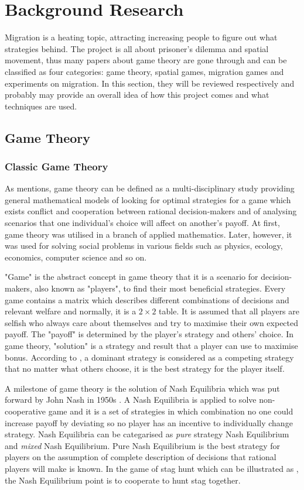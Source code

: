 \chapter{Background Research}
Migration is a heating topic, attracting increasing people to figure out what strategies behind. The project is all about prisoner's dilemma and spatial movement, thus many papers about game theory are gone through and can be classified as four categories: game theory, spatial games, migration games and experiments on migration. In this section, they will be reviewed respectively and probably may provide an overall idea of how this project comes and what techniques are used.
\section{Game Theory}
\subsection{Classic Game Theory}
As \citet{myerson2013game} mentions, game theory can be defined as a multi-disciplinary study providing general mathematical models of looking for optimal strategies for a game which exists conflict and cooperation between rational decision-makers and of analysing scenarios that one individual's choice will affect on another's payoff. At first, game theory was utilised in a branch of applied mathematics. Later, however, it was used for solving social problems in various fields such as physics, ecology, economics, computer science and so on.

"Game" is the abstract concept in game theory that it is a scenario for decision-makers, also known as "players", to find their most beneficial strategies. Every game contains a matrix which describes different combinations of decisions and relevant welfare and normally, it is a $2 \times 2$ table. It is assumed that all players are selfish who always care about themselves and try to maximise their own expected payoff. The "payoff" is determined by the player's strategy and others' choice. In game theory, "solution" is a strategy and result that a player can use to maximise bonus. According to \citet{cremer1988full}, a dominant strategy is considered as a competing strategy that no matter what others choose, it is the best strategy for the player itself.

A milestone of game theory is the solution of Nash Equilibria which was put forward by John Nash in  1950s \citep{nash1951non}. A Nash Equilibria is applied to solve non-cooperative game and it is a set of strategies in which combination no one could increase payoff by deviating so no player has an incentive to individually change strategy. Nash Equilibria can be categarised as \textit{pure} strategy Nash Equilibrium and  \textit{mixed} Nash Equilibrium. Pure Nash Equilibrium is the best strategy for players on the assumption of complete description of decisions that rational players will make is known. In the game of stag hunt which can be illustrated as , the Nash Equilibrium point is to cooperate to hunt stag together.

